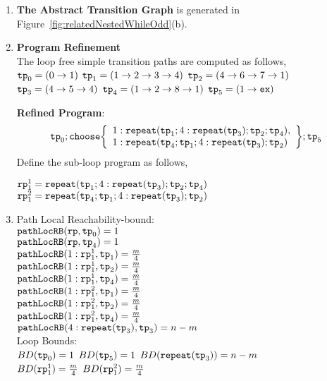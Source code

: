   \begin{enumerate}
    \item  \textbf{The Abstract Transition Graph} is generated in Figure~\ref{fig:relatedNestedWhileOdd}(b).
    \item \textbf{Program Refinement}
    \\
    The loop free simple transition paths are computed as follows,
    \\ 
    $\mathtt{tp}_0 = (0 \to 1)$
      \quad
      $\mathtt{tp}_1 = (1 \to 2 \to 3 \to 4)$
      \quad
      $\mathtt{tp}_2 = (4 \to 6 \to 7 \to 1)$
      \quad
      $\mathtt{tp}_3 = (4 \to 5 \to 4)$
      \quad
      $\mathtt{tp}_4 = (1 \to 2 \to 8 \to 1)$
      \quad
      $\mathtt{tp}_5 = (1 \to \mathtt{ex})$

  \textbf{Refined Program}:
    \[
    \tpath_0 ; \rpchoose{ 
      \begin{array}{l}
        1: \rprepeat(\tpath_1; 4:\rprepeat(\tpath_3); \tpath_2; \tpath_4), \\
        1: \rprepeat(\tpath_4; \tpath_1; 4:\rprepeat(\tpath_3); \tpath_2) 
      \end{array}
      }; \tpath_5
    \]
    Define the sub-loop program as follows,
    
    $\mathtt{rp}_1^1 = \mathtt{repeat}(\mathtt{tp}_1; 4:\mathtt{repeat}(\mathtt{tp}_3); \mathtt{tp}_2; \mathtt{tp}_4)$
    \\
    $\mathtt{rp}_1^2 = \mathtt{repeat}(\mathtt{tp}_4; \mathtt{tp}_1; 4:\mathtt{repeat}(\mathtt{tp}_3); \mathtt{tp}_2) $
    \item {Path Local Reachability-bound}:
    \\
    $\mathtt{pathLocRB}(\mathtt{rp}, \mathtt{tp}_0) = 1$ \\
    $\mathtt{pathLocRB}(\mathtt{rp}, \mathtt{tp}_4) = 1$ \\
    $\mathtt{pathLocRB}(1: \mathtt{rp}_1^1, \mathtt{tp}_1) = \frac{m}{4}$ \\
    $\mathtt{pathLocRB}(1: \mathtt{rp}_1^1, \mathtt{tp}_2) = \frac{m}{4}$ \\
    $\mathtt{pathLocRB}(1: \mathtt{rp}_1^1, \mathtt{tp}_4) = \frac{m}{4}$ \\
    $\mathtt{pathLocRB}(1: \mathtt{rp}_1^2, \mathtt{tp}_1) = \frac{m}{4}$ \\
    $\mathtt{pathLocRB}(1: \mathtt{rp}_1^2, \mathtt{tp}_2) = \frac{m}{4}$ \\
    $\mathtt{pathLocRB}(1: \mathtt{rp}_1^2, \mathtt{tp}_4) = \frac{m}{4}$ \\
    $\mathtt{pathLocRB}(4: \mathtt{repeat}(\mathtt{tp}_3), \mathtt{tp}_3) = n - m$ 
    \\
    Loop Bounds:
    \\
    $BD(\mathtt{tp}_0) = 1$
    \quad
    $BD(\mathtt{tp}_5) = 1$
    \quad
    $BD(\mathtt{repeat}(\mathtt{tp}_3)) = n - m $
    \\
    $BD(\mathtt{rp}_1^1) = \frac{m}{4} $
    \quad
    $BD(\mathtt{rp}_1^2) = \frac{m}{4} $


\end{enumerate}
